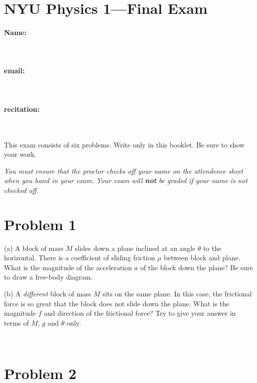 \documentclass[12pt]{article}
\begin{document}
\section*{NYU Physics 1---Final Exam}

\vfill

\paragraph{Name:} ~

\paragraph{email:} ~

\paragraph{recitation:} ~

\vfill

This exam consists of six problems.  Write only in this booklet.  Be
sure to show your work.

\vfill

\emph{You must ensure that the proctor checks off your name on the
attendence sheet when you hand in your exam.  Your exam will
\textbf{not} be graded if your name is not checked off.}

\clearpage

\section*{Problem 1}

(a) A block of mass $M$ slides down a plane inclined at an angle
$\theta$ to the horizontal.  There is a coefficient of sliding
friction $\mu$ between block and plane.  What is the magnitude of the
acceleration $a$ of the block down the plane?  Be sure to draw a
free-body diagram.

\vfill

(b) A \emph{different} block of mass $M$ sits on the same plane.  In
this case, the frictional force is so great that the block does not
slide down the plane.  What is the magnitude $f$ and direction of the
frictional force?  Try to give your answer in terms of $M$, $g$ and
$\theta$ only.

\vfill ~

\clearpage

\section*{Problem 2}
\end{document}
